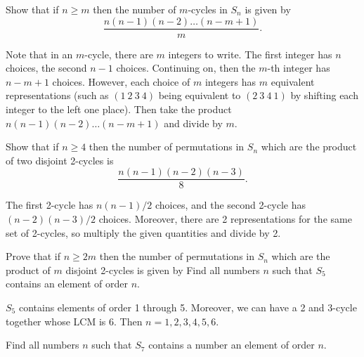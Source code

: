\begin{specialexercise}\label{ex1.3.16}
    Show that if $n \ge m$ then the number of $m$-cycles in $S_n$ is given by
    \[\frac{n(n-1)(n-2)\dots(n-m+1)}{m}.\]
\end{specialexercise}

\begin{sol}
    Note that in an $m$-cycle, there are $m$ integers to write. The first integer has $n$ choices, the second $n - 1$ choices. Continuing on, then the $m$-th integer has $n - m + 1$ choices. However, each choice of $m$ integers has $m$ equivalent representations (such as $(1\ 2\ 3\ 4)$ being equivalent to $(2\ 3\ 4\ 1)$ by shifting each integer to the left one place). Then take the product $n(n - 1)(n - 2) \ldots (n - m + 1)$ and divide by $m$.
\end{sol}

\begin{exercise}\label{ex1.3.17}
    Show that if $n \geq 4$ then the number of permutations in $S_n$ which are the product of two disjoint 2-cycles is
    \[\frac{n(n - 1)(n - 2)(n - 3)}{8}.\]
\end{exercise}

\begin{sol}
    The first 2-cycle has $n(n - 1)/2$ choices, and the second 2-cycle has $(n - 2)(n - 3)/2$ choices. Moreover, there are 2 representations for the same set of 2-cycles, so multiply the given quantities and divide by 2.
\end{sol}

\begin{exercise}\label{ex1.3.18}
     Prove that if $n \geq 2m$ then the number of permutations in $S_n$ which are the product of $m$ disjoint 2-cycles is given by
    Find all numbers $n$ such that $S_5$ contains an element of order $n$.
\end{exercise}

\begin{sol}
    $S_5$ contains elements of order 1 through 5. Moreover, we can have a 2 and 3-cycle together whose LCM is 6. Then $n = 1, 2, 3, 4, 5, 6$.
\end{sol}

\begin{exercise}\label{ex1.3.19}
    Find all numbers $n$ such that $S_7$ contains a number an element of order $n$.
\end{exercise}

